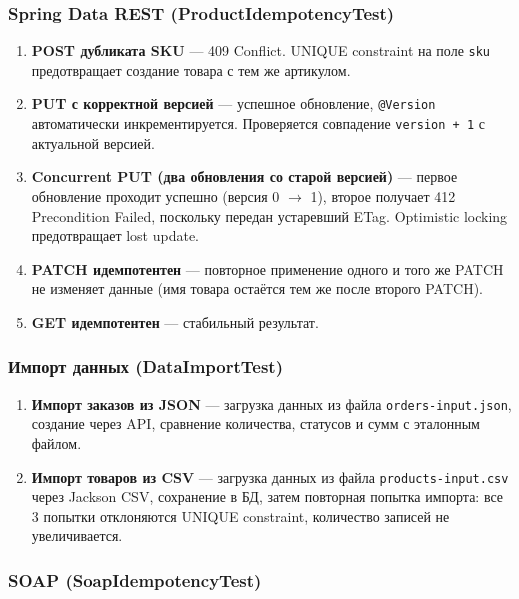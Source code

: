 \subsubsection{Spring Data REST (ProductIdempotencyTest)}

\begin{enumerate}
    \item \textbf{POST дубликата SKU} --- 409 Conflict. UNIQUE constraint на поле \texttt{sku} предотвращает создание товара с тем же артикулом.
    \item \textbf{PUT с корректной версией} --- успешное обновление, \texttt{@Version} автоматически инкрементируется. Проверяется совпадение \mbox{\texttt{version~+~1}} с актуальной версией.
    \item \textbf{Concurrent PUT (два обновления со старой версией)} --- первое обновление проходит успешно (версия 0 $\to$ 1), второе получает 412 Precondition Failed, поскольку передан устаревший ETag. Optimistic locking предотвращает lost update.
    \item \textbf{PATCH идемпотентен} --- повторное применение одного и того же PATCH не изменяет данные (имя товара остаётся тем же после второго PATCH).
    \item \textbf{GET идемпотентен} --- стабильный результат.
\end{enumerate}

\subsubsection{Импорт данных (DataImportTest)}

\begin{enumerate}
    \item \textbf{Импорт заказов из JSON} --- загрузка данных из файла \mbox{\texttt{orders-input.json}}, создание через API, сравнение количества, статусов и сумм с эталонным файлом.
    \item \textbf{Импорт товаров из CSV} --- загрузка данных из файла \mbox{\texttt{products-input.csv}} через Jackson CSV, сохранение в БД, затем повторная попытка импорта: все 3 попытки отклоняются UNIQUE constraint, количество записей не увеличивается.
\end{enumerate}

\subsubsection{SOAP (SoapIdempotencyTest)}

